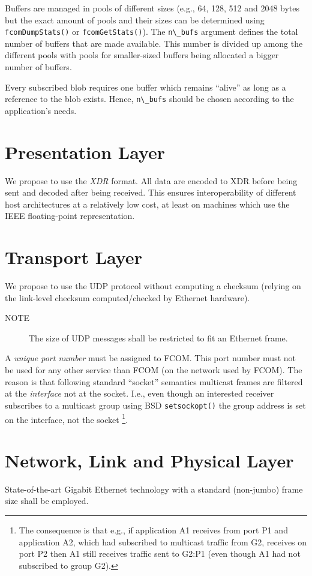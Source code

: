 \documentclass[11pt]{article}
\newcommand{\fcom}{FCOM}
\newcommand{\blob}{blob}
\newcommand{\cstl}[1]{{\lstinline+#1+}}
\newcommand{\note}[1]{
	\begin{description}
		\item[NOTE] #1
	\end{description}
}
\begin{document}
      Buffers are managed in pools of different sizes
      (e.g., 64, 128, 512 and 2048 bytes but the exact
      amount of pools and their sizes can be determined
      using \cstl{fcomDumpStats()} or \cstl{fcomGetStats()}).
      The \cstl{n\_bufs} argument defines the total
      number of buffers that are made available. This
      number is divided up among the different pools with
      pools for smaller-sized buffers being allocated a
      bigger number of buffers.

      Every subscribed \blob{} requires one buffer
      which remains ``alive'' as long as a reference
      to the \blob{} exists. Hence, \cstl{n\_bufs}
      should be chosen according to the application's
      needs.
     
\section{Presentation Layer}
We propose to use the {\em XDR} format. All data are encoded
to XDR before being sent and decoded after being received.
This ensures interoperability of different host architectures
at a relatively low cost, at least on machines which use the
IEEE floating-point representation.

\section{Transport Layer}
We propose to use the UDP protocol without computing a checksum
(relying on the link-level checksum computed/checked by Ethernet hardware).

\note{The size of UDP messages shall be restricted to
fit an Ethernet frame.}

A {\em unique port number} must be assigned to \fcom{}. This port
number must not be used for any other service than \fcom{}
(on the network used by \fcom{}).
The reason is that following standard ``socket'' semantics
multicast frames are filtered at the {\em interface} not at the
socket. I.e., even though an interested receiver subscribes
to a multicast group using BSD {\tt setsockopt()} the
group address is set on the interface, not the socket%
\footnote{
The consequence is that e.g., if application A1 receives
from port P1 and application A2, which
had subscribed to multicast traffic from G2, receives on
port P2 then A1 still receives traffic sent to G2:P1
(even though A1 had not subscribed to group G2).
}.

\section{Network, Link and Physical Layer}
State-of-the-art Gigabit Ethernet technology with a
standard (non-jumbo) frame size shall be employed.
\end{document}
